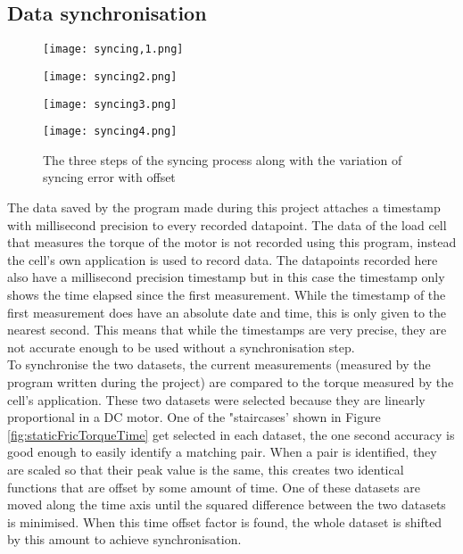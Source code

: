 \documentclass[12pt]{article}
\begin{document}
\subsection{Data synchronisation}
\label{sec:staticFricSyncing}
\begin{figure}[h]

    \begin{minipage}{0.49\textwidth}
        \centering
        \texttt{[image: syncing,1.png]}
        
    \end{minipage}
    \begin{minipage}{0.49\textwidth}
        \centering
        \texttt{[image: syncing2.png]}
        
    \end{minipage}

    \begin{minipage}{0.49\textwidth}
        \centering
        \texttt{[image: syncing3.png]}
        
    \end{minipage}
    \begin{minipage}{0.49\textwidth}
        \centering
        \texttt{[image: syncing4.png]}
        
    \end{minipage}
    \caption{The three steps of the syncing process along with the variation of syncing error with offset}
    \label{fig:syncing}
\end{figure}



The data saved by the program made during this project attaches a timestamp with millisecond precision to every recorded datapoint. The data of the load cell that measures the torque of the motor is not recorded using this program, instead the cell's own application is used to record data. The datapoints recorded here also have a millisecond precision timestamp but in this case the timestamp only shows the time elapsed since the first measurement. While the timestamp of the first measurement does have an absolute date and time, this is only given to the nearest second. This means that while the timestamps are very precise, they are not accurate enough to be used without a synchronisation step.\\

To synchronise the two datasets, the current measurements (measured by the program written during the project) are compared to the torque measured by the cell's application. These two datasets were selected because they are linearly proportional in a DC motor. One of the "staircases' shown in Figure \ref{fig:staticFricTorqueTime} get selected in each dataset, the one second accuracy is good enough to easily identify a matching pair. When a pair is identified, they are scaled so that their peak value is the same, this creates two identical functions that are offset by some amount of time. One of these datasets are moved along the time axis until the squared difference between the two datasets is minimised. When this time offset factor is found, the whole dataset is shifted by this amount to achieve synchronisation.
\end{document}
